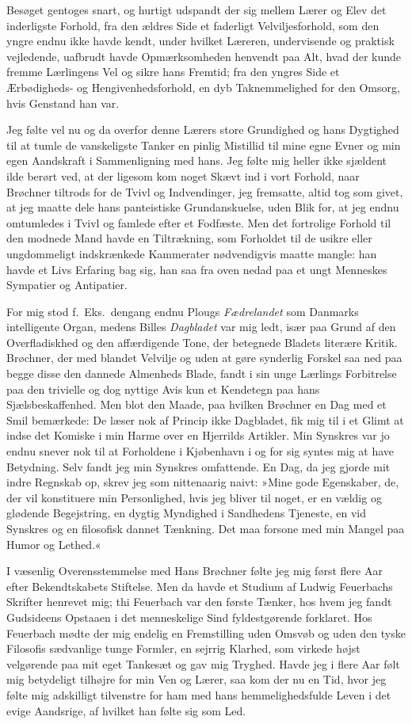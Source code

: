 \documentclass[12pt,a4paper]{article}
\newcommand{\pnum}[1]{\noindent\makebox[0pt][r]{\small\textit{[#1]}\quad}}
\newcommand{\apage}[1]{\marginnote{\footnotesize\textit{[#1]}}}
\begin{document}
Besøget gentoges snart, og hurtigt udspandt der sig mellem Lærer og
Elev det inderligste Forhold, fra den ældres Side et faderligt
Velviljesforhold, som den yngre endnu ikke havde kendt, under hvilket
Læreren, undervisende og praktisk vejledende, uafbrudt havde
Opmærksomheden henvendt paa Alt, hvad der kunde fremme Lærlingens Vel
og sikre hans Fremtid; fra den yngres Side et Ærbødigheds- og
Hengivenhedsforhold, en dyb Taknemmelighed for den Omsorg, hvis
Genstand han var.

Jeg følte vel nu og da overfor denne Lærers store \pnum{131}Grundighed \apage{131}
og hans Dygtighed til at tumle de vanskeligste Tanker en pinlig
Mistillid til mine egne Evner og min egen Aandskraft i Sammenligning
med hans. Jeg følte mig heller ikke sjældent ilde berørt ved, at der
ligesom kom noget Skævt ind i vort Forhold, naar Brøchner tiltrods for
de Tvivl og Indvendinger, jeg fremsatte, altid tog som givet, at jeg
maatte dele hans panteistiske Grundanskuelse, uden Blik for, at jeg
endnu omtumledes i Tvivl og famlede efter et Fodfæste. Men det
fortrolige Forhold til den modnede Mand havde en Tiltrækning, som
Forholdet til de usikre eller ungdommeligt indskrænkede Kammerater
nødvendigvis maatte mangle: han havde et Livs Erfaring bag sig, han
saa fra oven nedad paa et ungt Menneskes Sympatier og Antipatier.

For mig stod f.\ Eks.\ dengang endnu Plougs \textit{Fædrelandet} som
Danmarks intelligente Organ, medens Billes \textit{Dagbladet} var mig
ledt, især paa Grund af den Overfladiskhed og den affærdigende Tone,
der betegnede Bladets literære Kritik. Brøchner, der med blandet
Velvilje og uden at gøre synderlig Forskel saa ned paa begge disse den
dannede Almenheds Blade, fandt i sin unge Lærlings Forbitrelse paa den
trivielle og dog nyttige Avis kun et Kendetegn paa hans
Sjælsbeskaffenhed. Men blot den Maade, paa hvilken Brøchner en Dag med
et Smil bemærkede: De læser nok af Princip ikke Dagbladet, fik mig til
i et Glimt at indse det Komiske i min Harme over en Hjerrilds Artikler.
Min Synskres var jo endnu snever nok til at Forholdene i Kjøbenhavn i
og for sig syntes mig at have Betydning. Selv fandt jeg min Synskres
omfattende. En Dag, da jeg gjorde mit indre Regnskab op, skrev jeg som
nittenaarig naivt: »Mine gode Egenskaber, de, der vil konstituere min
Personlighed, hvis jeg bliver til noget, er en vældig og glødende
Begejstring, en dygtig Myndighed i Sandhedens Tjeneste, en vid
\pnum{132}Synskres \apage{132} og en filosofisk dannet Tænkning. Det maa forsone
med min Mangel paa Humor og Lethed.«

I væsenlig Overensstemmelse med Hans Brøchner følte jeg mig først
flere Aar efter Bekendtskabets Stiftelse. Men da havde et Studium af
Ludwig Feuerbachs Skrifter henrevet mig; thi Feuerbach var den første
Tænker, hos hvem jeg fandt Gudsideens Opstaaen i det menneskelige Sind
fyldestgørende forklaret. Hos Feuerbach mødte der mig endelig en
Fremstilling uden Omsvøb og uden den tyske Filosofis sædvanlige tunge
Formler, en sejrrig Klarhed, som virkede højst velgørende paa mit eget
Tankesæt og gav mig Tryghed. Havde jeg i flere Aar følt mig betydeligt
tilhøjre for min Ven og Lærer, saa kom der nu en Tid, hvor jeg følte
mig adskilligt tilvenstre for ham med hans hemmelighedsfulde Leven i
det evige Aandsrige, af hvilket han følte sig som Led.
\end{document}
